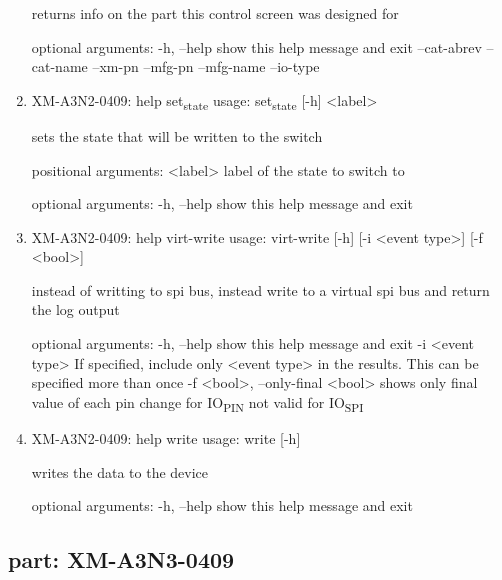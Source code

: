\documentclass[11pt]{article}
\begin{document}
\begin{enumerate}
returns info on the part this control screen was designed for

optional arguments:
  -h, --help   show this help message and exit
  --cat-abrev
  --cat-name
  --xm-pn
  --mfg-pn
  --mfg-name
  --io-type

\item XM-A3N2-0409: help set\textsubscript{state}
\label{sec:org686cafb}
usage: set\textsubscript{state} [-h] <label>

sets the state that will be written to the switch

positional arguments:
  <label>     label of the state to switch to

optional arguments:
  -h, --help  show this help message and exit

\item XM-A3N2-0409: help virt-write
\label{sec:org97bc19a}
usage: virt-write [-h] [-i <event type>] [-f <bool>]

instead of writting to spi bus, instead write to a virtual spi bus and return
the log output

optional arguments:
  -h, --help            show this help message and exit
  -i <event type>       If specified, include only <event type> in the
                        results. This can be specified more than once
  -f <bool>, --only-final <bool>
                        shows only final value of each pin change for IO\textsubscript{PIN}
                        not valid for IO\textsubscript{SPI}

\item XM-A3N2-0409: help write
\label{sec:org9d870a1}
usage: write [-h]

writes the data to the device

optional arguments:
  -h, --help  show this help message and exit
\end{enumerate}

\subsection{part: XM-A3N3-0409}
\label{sec:orgb577ad0}
\end{document}
